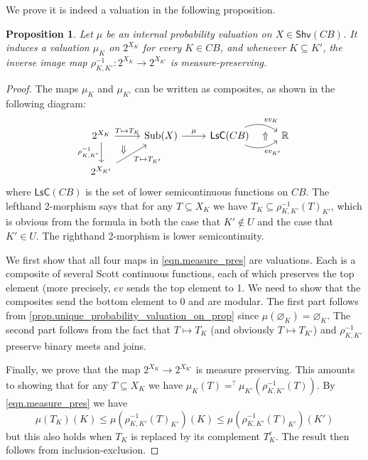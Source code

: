 \documentclass[11pt, oneside, article]{memoir}
\theoremstyle{plain}
\newtheorem{proposition}[theorem]{Proposition}
\theoremstyle{definition}
\theoremstyle{remark}
\renewcommand{\ss}{\subseteq}
\newcommand{\Set}[1]{\mathrm{#1}}
\newcommand{\fun}[1]{\mathit{#1}}
\newcommand{\Fun}[1]{\mathsf{#1}}
\newcommand{\RR}{\mathbb{R}}
\newcommand{\Shv}{\Fun{Shv}}
\newcommand{\Sub}{\Set{Sub}}
\newcommand{\lsc}{\Fun{LsC}}
\newcommand{\inv}{^{-1}}
\newcommand{\ev}{\fun{ev}}
\begin{document}
We prove it is indeed a valuation in the following proposition.
\begin{proposition}\label{prop.int_to_ext_measure_pres}
Let $\mu$ be an internal probability valuation on $X\in\Shv(CB)$. It induces a valuation $\mu_K$ on $2^{X_K}$ for every $K\in CB$, and whenever $K\ss K'$, the inverse image map $\rho_{K,K'}\inv\colon 2^{X_K}\to 2^{X_{K'}}$ is measure-preserving.
\end{proposition}
\begin{proof}
The maps $\mu_K$ and $\mu_{K'}$ can be written as composites, as shown in the following diagram:
\begin{equation}\label{eqn.measure_pres}
\begin{tikzcd}
	2^{X_K}\ar[d, "\rho_{K,K'}\inv"']\ar[r, "T\mapsto T_K"]\ar[dr, phantom, near start, "\Downarrow"]&
	\Sub(X)\ar[r, "\mu"]&
	\lsc(CB)\ar[r, bend left, "\ev_K"]\ar[r, bend right, "\ev_{K'}"']\ar[r, phantom, "\Uparrow"]&
	\RR\\
	2^{X_{K'}}\ar[ur, "T\mapsto T_{K'}"']&{}
\end{tikzcd}
\end{equation}
where $\lsc(CB)$ is the set of lower semicontinuous functions on $CB$. The lefthand 2-morphism says that for any $T\ss X_K$ we have $T_K\ss \rho_{K,K'}\inv(T)_{K'}$, which is obvious from the formula in both the case that $K'\not\in U$ and the case that $K'\in U$. The righthand 2-morphism is lower semicontinuity.

We first show that all four maps in \cref{eqn.measure_pres} are valuations. Each is a composite of several Scott continuous functions, each of which preserves the top element (more precisely, $\ev$ sends the top element to 1. We need to show that the composites send the bottom element to 0 and are modular. The first part follows from \cref{prop.unique_probability_valuation_on_prop} since $\mu(\varnothing_K)=\varnothing_K$. The second part follows from the fact that $T\mapsto T_K$ (and obviously $T\mapsto T_{K'}$) and $\rho_{K,K'}\inv$ preserve binary meets and joins.

Finally, we prove that the map $2^{X_K}\to 2^{X_{K'}}$ is measure preserving. This amounts to showing that for any $T\ss X_K$ we have $\mu_K(T)=^?\mu_{K'}(\rho_{K,K'}\inv(T))$. By \cref{eqn.measure_pres} we have
\[\mu(T_K)(K)\leq\mu(\rho_{K,K'}\inv(T)_{K'})(K)\leq\mu(\rho_{K,K'}\inv(T)_{K'})(K')\]
but this also holds when $T_K$ is replaced by its complement $T_K^c$. The result then follows from inclusion-exclusion.

\end{proof}
\end{document}
